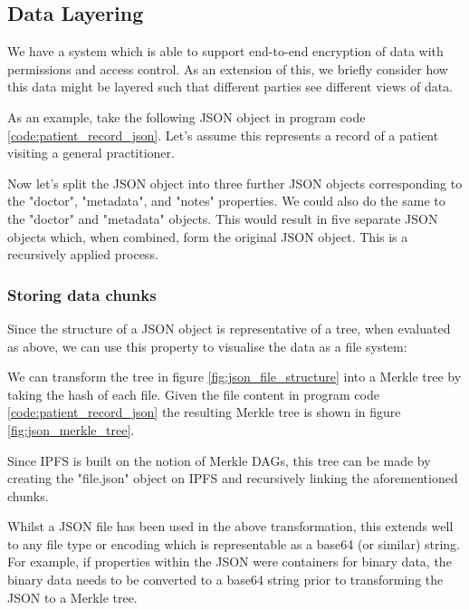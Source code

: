 \subsection{Data Layering}

We have a system which is able to support end-to-end encryption of data with permissions and access control. As an extension of this, we briefly consider how this data might be layered such that different parties see different views of data.

As an example, take the following JSON object in program code \ref{code:patient_record_json}. Let's assume this represents a record of a patient visiting a general practitioner.



Now let's split the JSON object into three further JSON objects corresponding to the "doctor", "metadata", and "notes" properties. We could also do the same to the "doctor" and "metadata" objects. This would result in five separate JSON objects which, when combined, form the original JSON object. This is a recursively applied process.

\subsubsection{Storing data chunks}

Since the structure of a JSON object is representative of a tree, when evaluated as above, we can use this property to visualise the data as a file system:



We can transform the tree in figure \ref{fig:json_file_structure} into a Merkle tree by taking the hash of each file. Given the file content in program code \ref{code:patient_record_json} the resulting Merkle tree is shown in figure \ref{fig:json_merkle_tree}.



Since IPFS is built on the notion of Merkle DAGs, this tree can be made by creating the "file.json" object on IPFS and recursively linking the aforementioned chunks.

Whilst a JSON file has been used in the above transformation, this extends well to any file type or encoding which is representable as a base64 (or similar) string. For example, if properties within the JSON were containers for binary data, the binary data needs to be converted to a base64 string prior to transforming the JSON to a Merkle tree.

